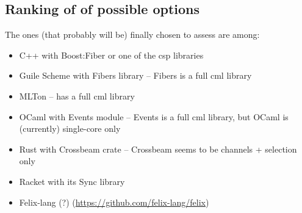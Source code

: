 
\subsection{Ranking of of possible options}


The ones (that probably will be) finally chosen to assess are among:
\begin{itemize}
\item C++ with Boost:Fiber or one of the \gls{csp} libraries
\item Guile Scheme with Fibers library -- Fibers is a full \gls{cml} library
\item MLTon -- has a full \gls{cml} library
\item OCaml with Events module -- Events is a full \gls{cml} library, but OCaml is (currently) single-core only
\item Rust with Crossbeam crate -- Crossbeam seems to be channels + selection only
\item Racket with its Sync library
\item Felix-lang (?) (\url{https://github.com/felix-lang/felix})
\end{itemize}

